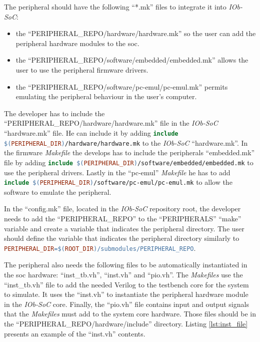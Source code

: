 The peripheral should have the following \enquote{*.mk} files to integrate it into \textit{IOb-SoC}:
\begin{itemize}
    \item the \enquote{PERIPHERAL\_REPO/hardware/hardware.mk} so the user can add the peripheral hardware modules to the \acrshort{soc}.
    \item the \enquote{PERIPHERAL\_REPO/software/embedded/embedded.mk} allows the user to use the peripheral firmware drivers.
    \item the \enquote{PERIPHERAL\_REPO/software/pc-emul/pc-emul.mk} permits emulating the peripheral behaviour in the user's computer.
\end{itemize}
The developer has to include the \enquote{PERIPHERAL\_REPO/hardware/hardware.mk} file in the \textit{IOb-SoC} \enquote{hardware.mk} file. He can include it by adding \lstinline[language=make]{include $(PERIPHERAL_DIR)/hardware/hardware.mk} to the \textit{IOb-SoC} \enquote{hardware.mk}. In the firmware \textit{Makefile} the develops has to include the peripherals \enquote{embedded.mk} file by adding \lstinline[language=make]{include $(PERIPHERAL_DIR)/software/embedded/embedded.mk} to use the peripheral drivers. Lastly in the \enquote{pc-emul} \textit{Makefile} he has to add \lstinline[language=make]{include $(PERIPHERAL_DIR)/software/pc-emul/pc-emul.mk} to allow the software to emulate the peripheral.

In the \enquote{config.mk} file, located in the \textit{IOb-SoC} repository root, the developer needs to add the \enquote{PERIPHERAL\_REPO} to the \enquote{PERIPHERALS} \enquote{make} variable and create a variable that indicates the peripheral directory. The user should define the variable that indicates the peripheral directory similarly to \lstinline[language=make]{PERIPHERAL_DIR=$(ROOT_DIR)/submodules/PERIPHERAL_REPO}.

The peripheral also needs the following files to be automatically instantiated in the \acrshort{soc} hardware: \enquote{inst\_tb.vh}, \enquote{inst.vh} and \enquote{pio.vh}. The \textit{Makefiles} use the \enquote{inst\_tb.vh} file to add the needed Verilog to the testbench core for the system to simulate. It uses the \enquote{inst.vh} to instantiate the peripheral hardware module in the \textit{IOb-SoC} core. Finally, the \enquote{pio.vh} file contains input and output signals that the \textit{Makefiles} must add to the system core hardware. Those files should be in the \enquote{PERIPHERAL\_REPO/hardware/include} directory. Listing \ref{lst:inst_file} presents an example of the \enquote{inst.vh} contents.

